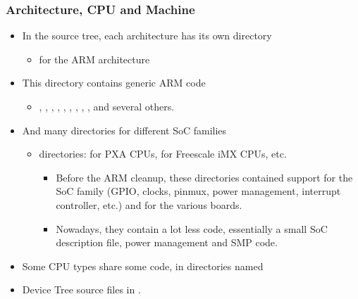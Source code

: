 \begin{frame}
  \frametitle{Architecture, CPU and Machine}
  \begin{itemize}
  \item In the source tree, each architecture has its own directory
    \begin{itemize}
    \item {} for the ARM architecture
    \end{itemize}
  \item This directory contains generic ARM code
    \begin{itemize}
    \item {}, ,
      , ,
      , ,
      , ,
      , 
      and several others.
    \end{itemize}
  \item And many directories for different SoC families
    \begin{itemize}
    \item {} directories:  for PXA CPUs,
       for Freescale iMX CPUs, etc.
      \begin{itemize}
      \item Before the ARM cleanup, these directories contained
        support for the SoC family (GPIO, clocks, pinmux, power
        management, interrupt controller, etc.) and for the various
        boards.
      \item Nowadays, they contain a lot less code, essentially a
        small SoC description file, power management and SMP code.
      \end{itemize}
    \end{itemize}
  \item Some CPU types share some code, in directories named
  \item Device Tree source files in .
  \end{itemize}
\end{frame}

